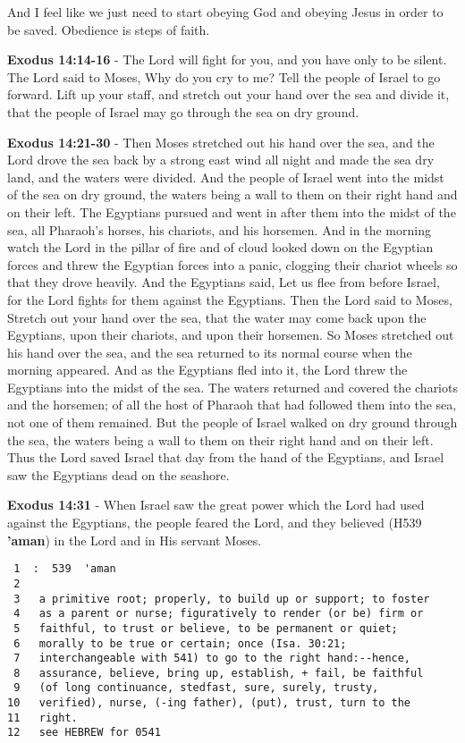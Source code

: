 \documentclass[11pt]{article}
\begin{document}
And I feel like we just need to start obeying God and obeying Jesus in order to be saved. Obedience is steps of faith.

\textbf{Exodus 14:14-16} - The Lord will fight for you, and you have only to be silent.  The Lord said to Moses, Why do you cry to me? Tell the people of Israel to go forward.  Lift up your staff, and stretch out your hand over the sea and divide it, that the people of Israel may go through the sea on dry ground.

\textbf{Exodus 14:21-30} - Then Moses stretched out his hand over the sea, and the Lord drove the sea back by a strong east wind all night and made the sea dry land, and the waters were divided. And the people of Israel went into the midst of the sea on dry ground, the waters being a wall to them on their right hand and on their left. The Egyptians pursued and went in after them into the midst of the sea, all Pharaoh's horses, his chariots, and his horsemen. And in the morning watch the Lord in the pillar of fire and of cloud looked down on the Egyptian forces and threw the Egyptian forces into a panic, clogging their chariot wheels so that they drove heavily. And the Egyptians said, Let us flee from before Israel, for the Lord fights for them against the Egyptians. Then the Lord said to Moses, Stretch out your hand over the sea, that the water may come back upon the Egyptians, upon their chariots, and upon their horsemen. So Moses stretched out his hand over the sea, and the sea returned to its normal course when the morning appeared. And as the Egyptians fled into it, the Lord threw the Egyptians into the midst of the sea. The waters returned and covered the chariots and the horsemen; of all the host of Pharaoh that had followed them into the sea, not one of them remained. But the people of Israel walked on dry ground through the sea, the waters being a wall to them on their right hand and on their left. Thus the Lord saved Israel that day from the hand of the Egyptians, and Israel saw the Egyptians dead on the seashore.

\textbf{Exodus 14:31} - When Israel saw the great power which the Lord had used against the Egyptians, the people feared the Lord, and they believed (H539 \textbf{'aman}) in the Lord and in His servant Moses.

\begin{verbatim}
 1  :  539  'aman
 2  
 3   a primitive root; properly, to build up or support; to foster
 4   as a parent or nurse; figuratively to render (or be) firm or
 5   faithful, to trust or believe, to be permanent or quiet;
 6   morally to be true or certain; once (Isa. 30:21;
 7   interchangeable with 541) to go to the right hand:--hence,
 8   assurance, believe, bring up, establish, + fail, be faithful
 9   (of long continuance, stedfast, sure, surely, trusty,
10   verified), nurse, (-ing father), (put), trust, turn to the
11   right.
12   see HEBREW for 0541
\end{verbatim}
\end{document}
